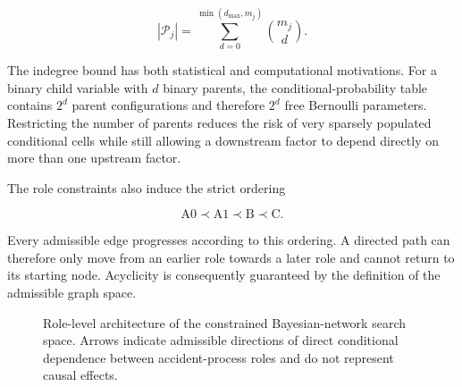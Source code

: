 \[
|\mathcal P_j|
=
\sum_{d=0}^{\min(d_{\max},m_j)}
\binom{m_j}{d}.
\]

The indegree bound has both statistical and computational motivations. For a
binary child variable with \(d\) binary parents, the conditional-probability
table contains \(2^d\) parent configurations and therefore \(2^d\) free
Bernoulli parameters. Restricting the number of parents reduces the risk of
very sparsely populated conditional cells while still allowing a downstream
factor to depend directly on more than one upstream factor.

The role constraints also induce the strict ordering

\[
\mathrm{A0}
\prec
\mathrm{A1}
\prec
\mathrm{B}
\prec
\mathrm{C}.
\]

Every admissible edge progresses according to this ordering. A directed path
can therefore only move from an earlier role towards a later role and cannot
return to its starting node. Acyclicity is consequently guaranteed by the
definition of the admissible graph space.

\begin{figure}[!htbp]
\centering


\caption{
Role-level architecture of the constrained Bayesian-network search space.
Arrows indicate admissible directions of direct conditional dependence
between accident-process roles and do not represent causal effects.
}
\label{fig:chap4_global_bn_architecture}
\end{figure}

